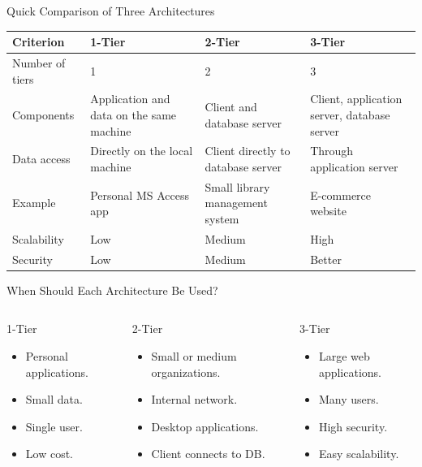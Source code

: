 \documentclass[aspectratio=169,11pt]{beamer}
\newcommand{\tightlist}{\setlength{\itemsep}{2pt}\setlength{\parskip}{0pt}}
\begin{document}
\begin{frame}{Quick Comparison of Three Architectures}
\scriptsize
\begin{tabularx}{\textwidth}{p{} X X X}
\toprule
\textbf{Criterion} & \textbf{1-Tier} & \textbf{2-Tier} & \textbf{3-Tier} \\
\midrule
Number of tiers & 1 & 2 & 3 \\
Components & Application and data on the same machine & Client and database server & Client, application server, database server \\
Data access & Directly on the local machine & Client directly to database server & Through application server \\
Example & Personal MS Access app & Small library management system & E-commerce website \\
Scalability & Low & Medium & High \\
Security & Low & Medium & Better \\
\bottomrule
\end{tabularx}
\end{frame}

\begin{frame}{When Should Each Architecture Be Used?}
\small
\begin{columns}[T]
\begin{block}{1-Tier}
\begin{itemize}
\tightlist
  \item Personal applications.
  \item Small data.
  \item Single user.
  \item Low cost.
\end{itemize}
\end{block}

\begin{block}{2-Tier}
\begin{itemize}
\tightlist
  \item Small or medium organizations.
  \item Internal network.
  \item Desktop applications.
  \item Client connects to DB.
\end{itemize}
\end{block}

\begin{block}{3-Tier}
\begin{itemize}
\tightlist
  \item Large web applications.
  \item Many users.
  \item High security.
  \item Easy scalability.
\end{itemize}
\end{block}
\end{columns}
\end{frame}
\end{document}
